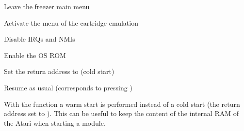\begin{itemize*}
\item Leave the freezer main menu
\item Activate the menu of the cartridge emulation
\item Disable IRQs and NMIs
\item Enable the OS ROM
\item Set the return address to  (cold start)
\item Resume as usual (corresponds to pressing )
\end{itemize*}

With the function  a warm start is performed instead of a cold start
(\ie the return address set to ). This can be useful to keep the
content of the internal RAM of the Atari when starting a module.
